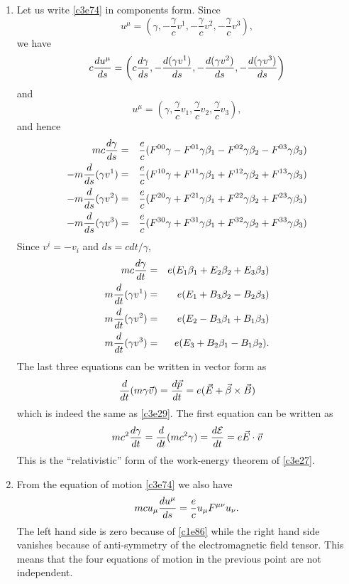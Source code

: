 \begin{enumerate}
\item Let us write \eqref{c3e74} in components form. Since
\[
u^\mu = \left(\gamma, -\frac{\gamma}{c}v^1, -\frac{\gamma}{c}v^2, -\frac{\gamma}{c}v^3\right),
\]
we have
\[
c\frac{d{u^\mu}}{d{s}} = \left(c\frac{d{\gamma}}{d{s}}, -\frac{d{(\gamma v^1)}}{d{s}}, 
-\frac{d{(\gamma v^2)}}{d{s}}, -\frac{d{(\gamma v^3)}}{d{s}}\right)
\]
and
\[
u^\mu = \left(\gamma, \frac{\gamma}{c}v_1, \frac{\gamma}{c}v_2, \frac{\gamma}{c}v_3\right),
\]
and hence
\begin{eqnarray*}
mc\frac{d{\gamma}}{d{s}} &=& \frac{e}{c}(F^{00}\gamma - F^{01}\gamma \beta_1 - F^{02}\gamma \beta_2 -F^{03}\gamma \beta_3) \\
-m\frac{d}{ds}(\gamma v^1)&=&\frac{e}{c}(F^{10}\gamma + F^{11}\gamma \beta_1 + F^{12}\gamma \beta_2 + F^{13}\gamma \beta_3) \\
-m\frac{d}{ds}(\gamma v^2)&=&\frac{e}{c}(F^{20}\gamma + F^{21}\gamma \beta_1 + F^{22}\gamma \beta_2 + F^{23}\gamma \beta_3) \\
-m\frac{d}{ds}(\gamma v^3)&=&\frac{e}{c}(F^{30}\gamma + F^{31}\gamma \beta_1 + F^{32}\gamma \beta_2 + F^{33}\gamma \beta_3) 
\end{eqnarray*}
Since $v^i = -v_i$ and $ds = cdt/\gamma$,
\begin{eqnarray*}
mc\frac{d{\gamma}}{d{t}} &=& e(E_1 \beta_1 + E_2 \beta_2 + E_3 \beta_3) \\
m\frac{d}{dt}(\gamma v^1) &=& e(E_1 + B_3 \beta_2 - B_2 \beta_3) \\
m\frac{d}{dt}(\gamma v^2) &=& e(E_2 - B_3 \beta_1 + B_1 \beta_3) \\
m\frac{d}{dt}(\gamma v^3) &=& e(E_3 + B_2 \beta_1 - B_1 \beta_2).
\end{eqnarray*}
The last three equations can be written in vector form as
\[
\frac{d}{dt}(m\gamma\vec{v}) = \frac{d{\vec{p}}}{d{t}} = e(\vec{E} + \vec{\beta} \times \vec{B})
\]
which is indeed the same as \eqref{c3e29}. The first equation can be written as
\[
mc^2\frac{d{\gamma}}{d{t}} = \frac{d}{dt}(mc^2\gamma) = \frac{d{\mathcal{E}}}{d{t}} = e\vec{E}\cdot\vec{v}
\]
This is the ``relativistic'' form of the work-energy theorem of \eqref{c3e27}.

\item From the equation of motion \eqref{c3e74} we also have
\[
mcu_\mu\frac{d{u^\mu}}{d{s}} = \frac{e}{c}u_\mu F^{\mu\nu}u_\nu.
\]
The left hand side is zero because of \eqref{c1e86} while the right hand side 
vanishes because of anti-symmetry of the electromagnetic field tensor. This means
that the four equations of motion in the previous point are not independent.


\end{enumerate}
